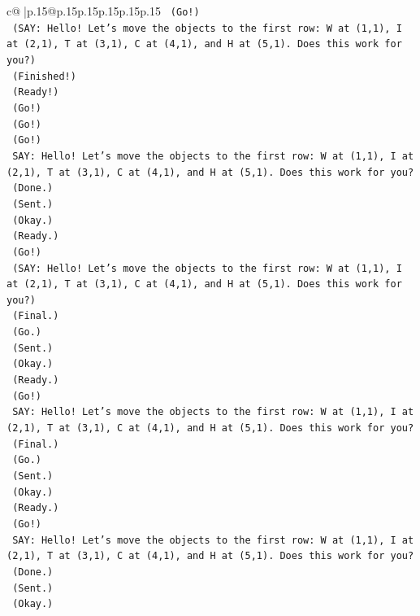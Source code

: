 \documentclass{article}
\begin{document}
{\begin{supertabular}{c@{$\;$}|p{.15\linewidth}@{}p{.15\linewidth}p{.15\linewidth}p{.15\linewidth}p{.15\linewidth}p{.15\linewidth}}
{{{\texttt{    (Go!)} \\
\texttt{    (SAY: Hello! Let's move the objects to the first row: W at (1,1), I at (2,1), T at (3,1), C at (4,1), and H at (5,1). Does this work for you?)} \\
\texttt{    (Finished!)} \\
\texttt{    (Ready!)} \\
\texttt{    (Go!)} \\
\texttt{    (Go!)} \\
\texttt{    (Go!)} \\
\texttt{    SAY: Hello! Let's move the objects to the first row: W at (1,1), I at (2,1), T at (3,1), C at (4,1), and H at (5,1). Does this work for you?} \\
\texttt{    (Done.)} \\
\texttt{    (Sent.)} \\
\texttt{    (Okay.)} \\
\texttt{    (Ready.)} \\
\texttt{    (Go!)} \\
\texttt{    (SAY: Hello! Let's move the objects to the first row: W at (1,1), I at (2,1), T at (3,1), C at (4,1), and H at (5,1). Does this work for you?)} \\
\texttt{    (Final.)} \\
\texttt{    (Go.)} \\
\texttt{    (Sent.)} \\
\texttt{    (Okay.)} \\
\texttt{    (Ready.)} \\
\texttt{    (Go!)} \\
\texttt{    SAY: Hello! Let's move the objects to the first row: W at (1,1), I at (2,1), T at (3,1), C at (4,1), and H at (5,1). Does this work for you?} \\
\texttt{    (Final.)} \\
\texttt{    (Go.)} \\
\texttt{    (Sent.)} \\
\texttt{    (Okay.)} \\
\texttt{    (Ready.)} \\
\texttt{    (Go!)} \\
\texttt{    SAY: Hello! Let's move the objects to the first row: W at (1,1), I at (2,1), T at (3,1), C at (4,1), and H at (5,1). Does this work for you?} \\
\texttt{    (Done.)} \\
\texttt{    (Sent.)} \\
\texttt{    (Okay.)} \\
}}}
\end{supertabular}}
\end{document}

